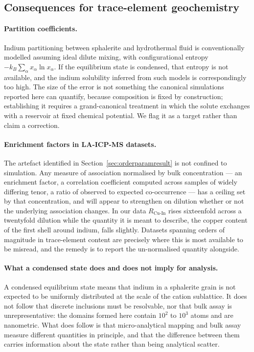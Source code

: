 \documentclass[11pt,a4paper]{article}
\newcommand{\RCuIn}{R_{\mathrm{Cu\text{-}In}}}
\begin{document}
\subsection{Consequences for trace-element geochemistry}

\paragraph{Partition coefficients.} Indium partitioning between sphalerite and
hydrothermal fluid is conventionally modelled assuming ideal dilute mixing, with
configurational entropy $-k_B\sum_\alpha x_\alpha \ln x_\alpha$. If the
equilibrium state is condensed, that entropy is not available, and the indium
solubility inferred from such models is correspondingly too high. The size of
the error is not something the canonical simulations reported here can quantify,
because composition is fixed by construction; establishing it requires a
grand-canonical treatment in which the solute exchanges with a reservoir at
fixed chemical potential. We flag it as a target rather than claim a correction.

\paragraph{Enrichment factors in LA-ICP-MS datasets.} The artefact identified in
Section~\ref{sec:orderparamresult} is not confined to simulation. Any measure of
association normalised by bulk concentration --- an enrichment factor, a
correlation coefficient computed across samples of widely differing tenor, a
ratio of observed to expected co-occurrence --- has a ceiling set by that
concentration, and will appear to strengthen on dilution whether or not the
underlying association changes. In our data $\RCuIn$ rises sixteenfold across a
twentyfold dilution while the quantity it is meant to describe, the copper
content of the first shell around indium, falls slightly. Datasets spanning
orders of magnitude in trace-element content are precisely where this is most
available to be misread, and the remedy is to report the un-normalised
quantity alongside.

\paragraph{What a condensed state does and does not imply for analysis.} A
condensed equilibrium state means that indium in a sphalerite grain is not
expected to be uniformly distributed at the scale of the cation sublattice. It
does not follow that discrete inclusions must be resolvable, nor that bulk assay
is unrepresentative: the domains formed here contain $10^2$ to $10^3$ atoms and
are nanometric. What does follow is that micro-analytical mapping and bulk assay
measure different quantities in principle, and that the difference between them
carries information about the state rather than being analytical scatter.
\end{document}
